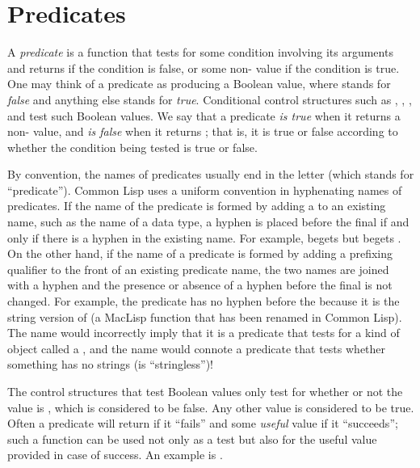 
\clearpage\def\pagestatus{FINAL PROOF}

\ifx \rulang\Undef

\chapter{Predicates}
\label{PREDS}

A \emph{predicate} is a function that tests for some condition involving
its arguments and returns {\false} if the condition is false, or some
non-{\false} value if the condition is true.  One may think of a predicate as
producing a Boolean value, where {\false} stands for \emph{false} and anything
else stands for \emph{true}.  Conditional control structures such as
,
, , and  test such Boolean values.
We say that a predicate \emph{is true} when it returns a non-{\false} value,
and \emph{is false} when it returns {\false}; that is, it is true or false
according to whether the condition being tested is true or false.

By convention, the names of predicates usually end in the letter
 (which stands for ``predicate'').
Common Lisp uses a uniform convention in hyphenating names of predicates.
If the name of the predicate is formed by adding a  to
an existing name, such as the name of a data type,
a hyphen is placed before the final  if and only if there is
a hyphen in the existing name.  For example,  begets 
but  begets .
On the other hand, if the name of a predicate is formed by adding
a prefixing qualifier to the front of an existing predicate name,
the two names are joined with a hyphen and the presence or absence
of a hyphen before the final  is not changed.  For example,
the predicate  has no hyphen before the 
because it is the string version of  (a MacLisp function
that has been renamed \cdf{<} in Common Lisp).  The name 
would incorrectly imply that it is a predicate that tests for a kind
of object called a , and the name 
would connote a predicate that tests whether something has no strings
(is ``stringless'')!

The control structures that test Boolean values only test for
whether or not the value is {\false}, which is considered to be false.  Any
other value is considered to be true.  Often a predicate will return {\false} if
it ``fails'' and some \emph{useful} value if it ``succeeds'';
such a function can be used not only as a test but
also for the useful value provided in case of success.  An example
is .

